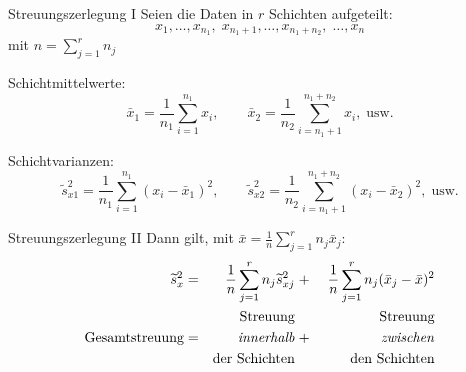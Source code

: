 \documentclass[
  10pt,
  ignorenonframetext,
]{beamer}
\begin{document}
\begin{frame}{Streuungszerlegung I}
\protect\hypertarget{streuungszerlegung-i}{}
Seien die Daten in \(r\) Schichten aufgeteilt: \begin{equation*}
  x_1,\ldots,x_{n_1},\; x_{n_1+1},\ldots,x_{n_1+n_2},\; \ldots,x_{n}
\end{equation*} mit \(n = \sum^r_{j = 1} n_j\)

Schichtmittelwerte: \begin{equation*}
  \bar x_1 = \frac{1}{n_1} \sum_{i=1}^{n_1} x_i, \qquad
  \bar x_2 = \frac{1}{n_2} \sum_{i=n_1+1}^{n_1 + n_2} x_i, \; \text{usw.}
\end{equation*}

Schichtvarianzen: \begin{equation*}
  \widetilde s_{x1}^2 = \frac{1}{n_1}\sum_{i=1}^{n_1}(x_i - \bar x_1)^2, \qquad
  \widetilde s_{x2}^2 = \frac{1}{n_2} \sum_{i=n_1+1}^{n_1 + n_2}(x_i- \bar x_2)^2,\; \text{usw.}
\end{equation*}
\end{frame}

\begin{frame}{Streuungszerlegung II}
\protect\hypertarget{streuungszerlegung-ii}{}
Dann gilt, mit \(\bar x = \frac{1}{n} \sum_{j=1}^r n_j \bar x_j\):
\begin{alignat*}{4}
  \widetilde s_x^2 &=& \frac{1}{n} \sum_{j=1}^r n_j \widetilde s_{xj}^2 &\;+\;& \frac{1}{n} \sum_{j=1}^r n_j(\bar x_j - \bar x)^2 \\
   && \text{Streuung} && \text{Streuung} \\
  \text{Gesamtstreuung} & = & \text{\emph{innerhalb}} &\;+\;& \text{\emph{zwischen}} \\
  && \text{der Schichten} && \text{den Schichten}
\end{alignat*}
\end{frame}
\end{document}
